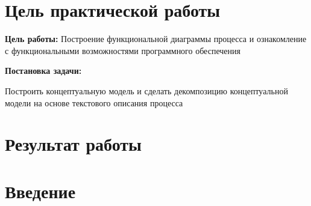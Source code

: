 
\section*{\LARGE Цель практической работы}

\textbf{Цель работы:} Построение функциональной диаграммы процесса и ознакомление с
функциональными возможностями программного обеспечения



\textbf{Постановка задачи:}\par
Построить концептуальную модель и сделать
декомпозицию концептуальной модели на основе текстового описания
процесса


\newpage

\section*{\LARGE Результат работы}

\section{Введение}

